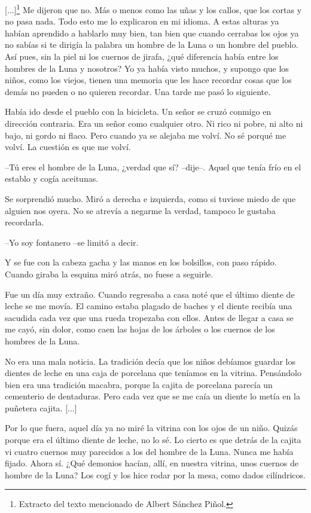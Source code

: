 \documentclass[a3paper]{tufte-handout}
\begin{document}
[...]\footnote{Extracto del texto mencionado de Albert Sánchez Piñol.} 
Me dijeron que no. Más o menos como las uñas y los callos, que los cortas y no pasa nada. Todo esto me lo explicaron en mi idioma. A estas alturas ya habían aprendido a hablarlo muy bien, tan bien que cuando cerrabas los ojos ya no sabías si te dirigía la palabra un hombre de la Luna o un hombre del pueblo. Así pues, sin la piel ni los cuernos de jirafa, ¿qué diferencia había entre los hombres de la Luna y nosotros? Yo ya había visto muchos, y supongo que los niños, como los viejos, tienen una memoria que les hace recordar cosas que los demás no pueden o no quieren recordar. Una tarde me pasó lo siguiente.

Había ido desde el pueblo con la bicicleta. Un señor se cruzó conmigo en dirección contraria. Era un señor como cualquier otro. Ni rico ni pobre, ni alto ni bajo, ni gordo ni flaco. Pero cuando ya se alejaba me volví. No sé porqué me volví. La cuestión es que me volví.

--Tú eres el hombre de la Luna, ¿verdad que sí? --dije--. Aquel que tenía frío en el establo y cogía aceitunas.

Se sorprendió mucho. Miró a derecha e izquierda, como si tuviese miedo de que alguien nos oyera. No se atrevía a negarme la verdad, tampoco le gustaba recordarla.

--Yo soy fontanero --se limitó a decir.

Y se fue con la cabeza gacha y las manos en los bolsillos, con paso rápido. Cuando giraba la esquina miró atrás, no fuese a seguirle.

Fue un día muy extraño. Cuando regresaba a casa noté que el último diente de leche se me movía. El camino estaba plagado de baches y el diente recibía una sacudida cada vez que una rueda tropezaba con ellos. Antes de llegar a casa se me cayó, sin dolor, como caen las hojas de los árboles o los cuernos de los hombres de la Luna.

No era una mala noticia. La tradición decía que los niños debíamos guardar los dientes de leche en una caja de porcelana que teníamos en la vitrina. Pensándolo bien era una tradición macabra, porque la cajita de porcelana parecía un cementerio de dentaduras. Pero cada vez que se me caía un diente lo metía en la puñetera cajita. [...]

Por lo que fuera, aquel día ya no miré la vitrina con los ojos de un niño. Quizás porque era el último diente de leche, no lo sé. Lo cierto es que detrás de la cajita vi cuatro cuernos muy parecidos a los del hombre de la Luna. Nunca me había fijado. Ahora sí. ¿Qué demonios hacían, allí, en nuestra vitrina, unos cuernos de hombre de la Luna? Los cogí y los hice rodar por la mesa, como dados cilíndricos.
\end{document}
